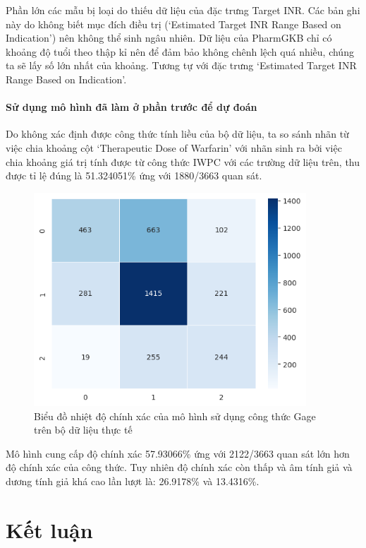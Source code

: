 \documentclass[14pt,oneside]{scrbook}
\begin{document}
Phần lớn các mẫu bị loại do thiếu dữ liệu của đặc trưng Target INR. Các
bản ghi này do không biết mục đích điều trị (`Estimated Target INR Range
Based on Indication') nên không thể sinh ngâu nhiên. Dữ liệu của
PharmGKB chỉ có khoảng độ tuổi theo thập kỉ nên để đảm bảo không chênh
lệch quá nhiều, chúng ta sẽ lấy số lớn nhất của khoảng. Tương tự với đặc
trưng `Estimated Target INR Range Based on Indication'.

\subsubsection{Sử dụng mô hình đã làm ở phần trước để dự
đoán}\label{sux1eed-dux1ee5ng-muxf4-huxecnh-ux111uxe3-luxe0m-ux1edf-phux1ea7n-trux1b0ux1edbc-ux111ux1ec3-dux1ef1-ux111ouxe1n-1}

Do không xác định được công thức tính liều của bộ dữ liệu, ta so sánh
nhãn từ việc chia khoảng cột `Therapeutic Dose of Warfarin' với nhãn
sinh ra bởi việc chia khoảng giá trị tính được từ công thức IWPC với các
trường dữ liệu trên, thu được tỉ lệ đúng là 51.324051\% ứng với
1880/3663 quan sát.

\begin{figure}
\centering
\includegraphics[width=\textwidth,height=8cm]{image/gage_heatmap_real.png}
\caption{Biểu đồ nhiệt độ chính xác của mô hình sử dụng công thức Gage
trên bộ dữ liệu thực tế}
\end{figure}

Mô hình cung cấp độ chính xác 57.93066\% ứng với 2122/3663 quan sát lớn
hơn độ chính xác của công thức. Tuy nhiên độ chính xác còn thấp và âm
tính giả và dương tính giả khá cao lần lượt là: 26.9178\% và 13.4316\%.

\chapter*{Kết luận}\label{kux1ebft-luux1eadn}
\end{document}
